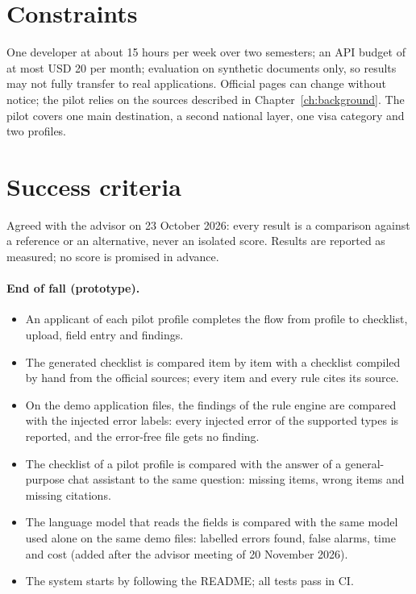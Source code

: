 \section{Constraints}
One developer at about 15 hours per week over two semesters; an API budget of at most USD 20 per
month; evaluation on synthetic documents only, so results may not fully transfer to real
applications. Official pages can change without notice; the pilot relies on the sources described
in Chapter~\ref{ch:background}. The pilot covers one main destination, a second national layer,
one visa category and two profiles.

\section{Success criteria}\label{sec:success}
Agreed with the advisor on 23 October 2026: every result is a comparison against a reference or
an alternative, never an isolated score. Results are reported as measured; no score is promised
in advance.

\paragraph{End of fall (prototype).}
\begin{itemize}
  \item An applicant of each pilot profile completes the flow from profile to checklist, upload,
    field entry and findings.
  \item The generated checklist is compared item by item with a checklist compiled by hand from
    the official sources; every item and every rule cites its source.
  \item On the demo application files, the findings of the rule engine are compared with the
    injected error labels: every injected error of the supported types is reported, and the
    error-free file gets no finding.
  \item The checklist of a pilot profile is compared with the answer of a general-purpose chat
    assistant to the same question: missing items, wrong items and missing citations.
  \item The language model that reads the fields is compared with the same model used alone on
    the same demo files: labelled errors found, false alarms, time and cost (added after the
    advisor meeting of 20 November 2026).
  \item The system starts by following the README; all tests pass in CI.
\end{itemize}


